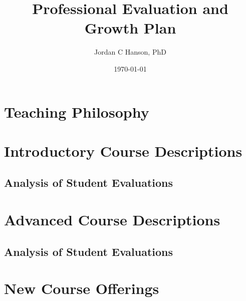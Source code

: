 \documentclass[10pt,oneside]{book}
\title{Professional Evaluation and Growth Plan}
\author{Jordan C Hanson, PhD}
\date{\today}
\begin{document}
\maketitle
\tableofcontents

\clearpage

\section{Teaching Philosophy}

\begin{flushleft}

\end{flushleft}

\clearpage

\section{Introductory Course Descriptions}

\begin{flushleft}

\end{flushleft}

\clearpage

\subsection{Analysis of Student Evaluations}

\begin{flushleft}

\end{flushleft}

\section{Advanced Course Descriptions}

\begin{flushleft}

\end{flushleft}

\subsection{Analysis of Student Evaluations}

\begin{flushleft}

\end{flushleft}

\section{New Course Offerings}

\begin{flushleft}

\end{flushleft}



\end{document}

